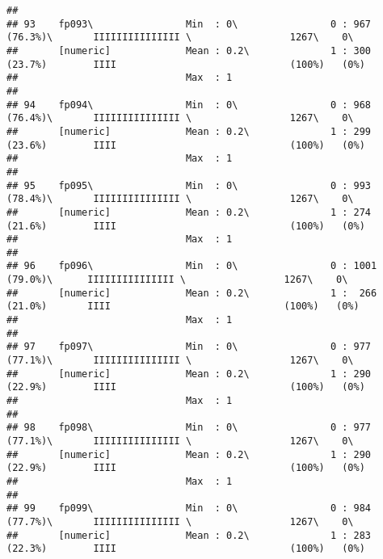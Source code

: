 \documentclass[]{article}
\begin{document}
\begin{verbatim}
## 
## 93    fp093\                Min  : 0\                0 : 967 (76.3%)\       IIIIIIIIIIIIIII \                 1267\    0\       
##       [numeric]             Mean : 0.2\              1 : 300 (23.7%)        IIII                              (100%)   (0%)     
##                             Max  : 1                                                                                            
## 
## 94    fp094\                Min  : 0\                0 : 968 (76.4%)\       IIIIIIIIIIIIIII \                 1267\    0\       
##       [numeric]             Mean : 0.2\              1 : 299 (23.6%)        IIII                              (100%)   (0%)     
##                             Max  : 1                                                                                            
## 
## 95    fp095\                Min  : 0\                0 : 993 (78.4%)\       IIIIIIIIIIIIIII \                 1267\    0\       
##       [numeric]             Mean : 0.2\              1 : 274 (21.6%)        IIII                              (100%)   (0%)     
##                             Max  : 1                                                                                            
## 
## 96    fp096\                Min  : 0\                0 : 1001 (79.0%)\      IIIIIIIIIIIIIII \                 1267\    0\       
##       [numeric]             Mean : 0.2\              1 :  266 (21.0%)       IIII                              (100%)   (0%)     
##                             Max  : 1                                                                                            
## 
## 97    fp097\                Min  : 0\                0 : 977 (77.1%)\       IIIIIIIIIIIIIII \                 1267\    0\       
##       [numeric]             Mean : 0.2\              1 : 290 (22.9%)        IIII                              (100%)   (0%)     
##                             Max  : 1                                                                                            
## 
## 98    fp098\                Min  : 0\                0 : 977 (77.1%)\       IIIIIIIIIIIIIII \                 1267\    0\       
##       [numeric]             Mean : 0.2\              1 : 290 (22.9%)        IIII                              (100%)   (0%)     
##                             Max  : 1                                                                                            
## 
## 99    fp099\                Min  : 0\                0 : 984 (77.7%)\       IIIIIIIIIIIIIII \                 1267\    0\       
##       [numeric]             Mean : 0.2\              1 : 283 (22.3%)        IIII                              (100%)   (0%)     

\end{verbatim}
\end{document}
